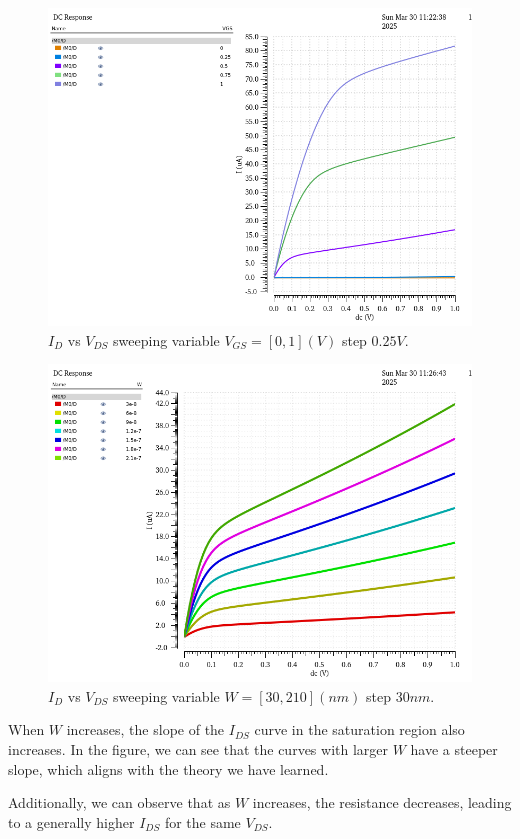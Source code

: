 
\begin{figure}[H]
	\centering
	\includegraphics[width = .6\linewidth]{sections/pic/EX2_NMOS_Id&Vds(Vgs_0_1_0_25)(w)(l).png}
	\caption{$I_D$ vs $V_{DS}$ sweeping variable $V_{GS} = [0, 1](V)$ step $0.25V$.}
	\label{f_EX2_NMOS_Id&Vds(Vgs_0_1_0_25)(w)(l)}
\end{figure}


\begin{figure}[H]
	\centering
	\includegraphics[width = .6\linewidth]{sections/pic/EX2_NMOS_Id&Vds(Vgs(w_30_210)(l).png}
	\caption{$I_D$ vs $V_{DS}$ sweeping variable $W = [30, 210](nm)$ step $30nm$.}
	\label{f_EX2_NMOS_Id&Vds(Vgs(w_30_210)(l)}
\end{figure}

\begin{discussion}
	\item When \( W \) increases, the slope of the \( I_{DS} \) curve in the saturation region also increases. In the figure, we can see that the curves with larger \( W \) have a steeper slope, which aligns with the theory we have learned.  
	
	\item Additionally, we can observe that as \( W \) increases, the resistance decreases, leading to a generally higher \( I_{DS} \) for the same \( V_{DS} \).
	
\end{discussion}

